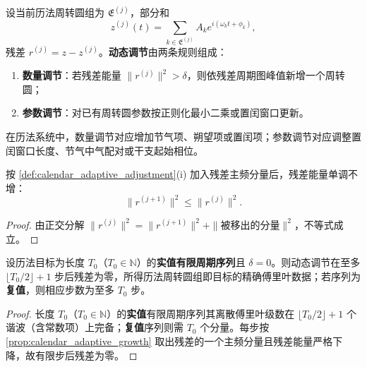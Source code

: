 \begin{definition}[历法周转圆组的动态调节]\label{def:calendar_adaptive_adjustment}
设当前历法周转圆组为 \(\mathfrak E^{(j)}\)，部分和
\[
z^{(j)}(t)=\sum_{k\in\mathfrak E^{(j)}}A_k e^{i(\omega_k t+\phi_k)},
\]
残差 \(r^{(j)}=z-z^{(j)}\)。\textbf{动态调节}由两条规则组成：
\begin{enumerate}[label=(\roman*)]
    \item \textbf{数量调节}：若残差能量 \(\|r^{(j)}\|^2>\delta\)，则依残差周期图峰值新增一个周转圆；
    \item \textbf{参数调节}：对已有周转圆参数按正则化最小二乘或置闰窗口更新。
\end{enumerate}
在历法系统中，数量调节对应增加节气项、朔望项或置闰项；参数调节对应调整置闰窗口长度、节气中气配对或干支起始相位。
\end{definition}

\begin{proposition}[数量调节的单调性]\label{prop:calendar_adaptive_growth}
按 \cref{def:calendar_adaptive_adjustment}(i) 加入残差主频分量后，残差能量单调不增：
\[
\|r^{(j+1)}\|^2\le\|r^{(j)}\|^2.
\]
\end{proposition}

\begin{proof}
由正交分解 \(\|r^{(j)}\|^2=\|r^{(j+1)}\|^2+\|\text{被移出的分量}\|^2\)，不等式成立。
\end{proof}

\begin{theorem}[动态调节的收敛性]\label{thm:calendar_adaptive_convergence}
设历法目标为长度 $T_0$（$T_0\in\mathbb N$）的\textbf{实值有限周期序列}且 $\delta=0$。则动态调节在至多 $\lfloor T_0/2\rfloor+1$ 步后残差为零，所得历法周转圆组即目标的精确傅里叶数据；若序列为\textbf{复值}，则相应步数为至多 $T_0$ 步。
\end{theorem}

\begin{proof}
长度 $T_0$（$T_0\in\mathbb N$）的\textbf{实值}有限周期序列其离散傅里叶级数在 $\lfloor T_0/2\rfloor+1$ 个谐波（含常数项）上完备；\textbf{复值}序列则需 $T_0$ 个分量。每步按 \cref{prop:calendar_adaptive_growth} 取出残差的一个主频分量且残差能量严格下降，故有限步后残差为零。
\end{proof}

